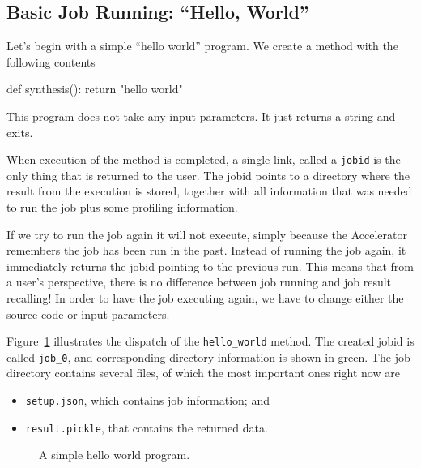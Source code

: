 \documentclass[a4paper]{article}
\begin{document}
\subsection{Basic Job Running:  ``Hello, World''}

Let's begin with a simple ``hello world'' program.  We create a method
with the following contents
\begin{python}
def synthesis():
    return "hello world"
\end{python}
This program does not take any input parameters.  It just returns a
string and exits.

When execution of the method is completed, a single link, called a
\texttt{jobid} is the only thing that is returned to the user.  The
jobid points to a directory where the result from the execution is
stored, together with all information that was needed to run the job
plus some profiling information.

If we try to run the job again it will not execute, simply because the
Accelerator remembers the job has been run in the past.  Instead of
running the job again, it immediately returns the jobid pointing to
the previous run.  This means that from a user's perspective, there is
no difference between job running and job result recalling!  In order
to have the job executing again, we have to change either the source
code or input parameters.

Figure~\ref{fig:execflow-hello-world} illustrates the dispatch of the
\texttt{hello\_world} method.  The created jobid is called
\texttt{job\_0}, and corresponding directory information is shown in
green.  The job directory contains several files, of which the most
important ones right now are
\begin{itemize}
  \item[] \texttt{setup.json}, which contains job information; and
  \item[] \texttt{result.pickle}, that contains the returned data.
\end{itemize}


\vfill
\begin{figure}[h!]
  \begin{center}
    
    \caption{A simple hello world program.}
    \label{fig:execflow-hello-world}
  \end{center}
\end{figure}

\clearpage
\end{document}
